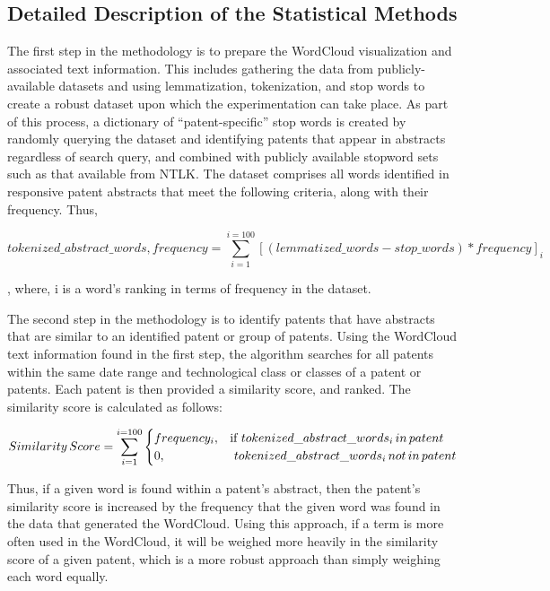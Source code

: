 \documentclass{article}
\begin{document}
\subsection{Detailed Description of the Statistical Methods}
The first step in the methodology is to prepare the WordCloud visualization and associated text information.  This includes gathering the data from publicly-available datasets and using lemmatization, tokenization, and stop words to create a robust dataset upon which the experimentation can take place.  As part of this process, a dictionary of “patent-specific” stop words is created by randomly querying the dataset and identifying patents that appear in abstracts regardless of search query, and combined with publicly available stopword sets such as that available from NTLK.  The dataset comprises all words identified in responsive patent abstracts that meet the following criteria, along with their frequency.  Thus,

\begin{equation}
tokenized\_abstract\_words, frequency = \sum_{i=1}^{i=100} [(lemmatized\_words - stop\_words) * frequency]_i
\end{equation}

, where, i is a word’s ranking in terms of frequency in the dataset.

The second step in the methodology is to identify patents that have abstracts that are similar to an identified patent or group of patents.  Using the WordCloud text information found in the first step, the algorithm searches for all patents within the same date range and technological class or classes of a patent or patents.  Each patent is then provided a similarity score, and ranked.  The similarity score is calculated as follows:

\begin{equation}
  Similarity\, Score = \sum_{i=1}^{i=100}
    \begin{cases}
      frequency_i, & \text{if}\ tokenized\_abstract\_words_i\, in\, patent \\
      0, & \text \ tokenized\_abstract\_words_i\, not\, in\, patent \\
    \end{cases}
\end{equation}

Thus, if a given word is found within a patent’s abstract, then the patent’s similarity score is increased by the frequency that the given word was found in the data that generated the WordCloud.  Using this approach, if a term is more often used in the WordCloud, it will be weighed more heavily in the similarity score of a given patent, which is a more robust approach than simply weighing each word equally.
\end{document}

